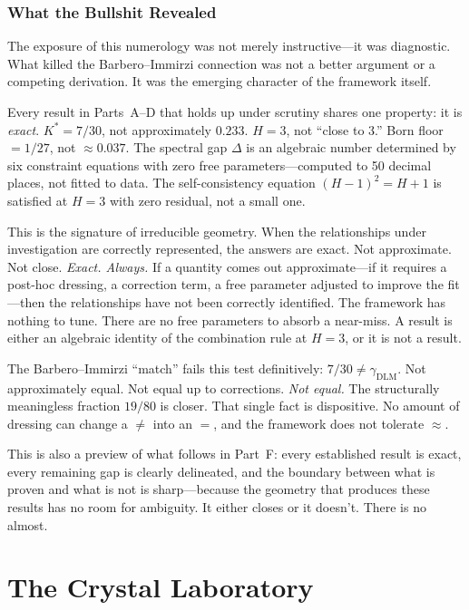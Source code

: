 \documentclass[11pt,a4paper]{article}
\theoremstyle{definition}
\theoremstyle{remark}
\begin{document}
\section{What the Bullshit Revealed}\label{sec:whatitrevealed}

The exposure of this numerology was not merely instructive---it was diagnostic. What killed the Barbero--Immirzi connection was not a better argument or a competing derivation. It was the emerging character of the framework itself.

Every result in Parts~A--D that holds up under scrutiny shares one property: it is \emph{exact}. $K^*=7/30$, not approximately $0.233$. $H=3$, not ``close to $3$.'' Born floor $=1/27$, not $\approx 0.037$. The spectral gap $\Delta$ is an algebraic number determined by six constraint equations with zero free parameters---computed to 50 decimal places, not fitted to data. The self-consistency equation $(H-1)^2=H+1$ is satisfied at $H=3$ with zero residual, not a small one.

This is the signature of irreducible geometry. When the relationships under investigation are correctly represented, the answers are exact. Not approximate. Not close. \emph{Exact. Always.} If a quantity comes out approximate---if it requires a post-hoc dressing, a correction term, a free parameter adjusted to improve the fit---then the relationships have not been correctly identified. The framework has nothing to tune. There are no free parameters to absorb a near-miss. A result is either an algebraic identity of the combination rule at $H=3$, or it is not a result.

The Barbero--Immirzi ``match'' fails this test definitively: $7/30\neq\gamma_{\mathrm{DLM}}$. Not approximately equal. Not equal up to corrections. \emph{Not equal.} The structurally meaningless fraction $19/80$ is closer. That single fact is dispositive. No amount of dressing can change a $\neq$ into an $=$, and the framework does not tolerate $\approx$.

This is also a preview of what follows in Part~F: every established result is exact, every remaining gap is clearly delineated, and the boundary between what is proven and what is not is sharp---because the geometry that produces these results has no room for ambiguity. It either closes or it doesn't. There is no almost.


\part{The Crystal Laboratory}\label{part:UQE}
\end{document}
